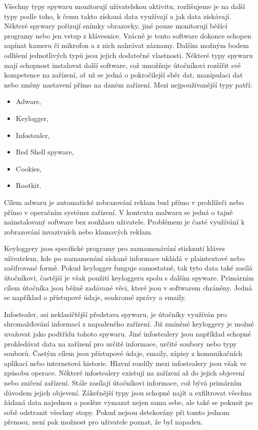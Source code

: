 Všechny typy spywaru monitorují uživatelskou aktivitu, rozlišujeme je na další typy podle toho, k čemu takto získaná data využívají a jak data získávají.
Některé spywary pořizují snímky obrazovky, jiné pouze monitorují běžící programy nebo jen vstup z klávesnice.
Vzácně je tento software dokonce schopen zapínat kameru či mikrofon a z nich nahrávat záznamy.
Dalším možným bodem odlišení jednotlivých typů jsou jejich dodatečné vlastnosti.
Některé typy spywaru mají schopnost instalovat další software, což umožňuje útočníkovi rozšířit své kompetence na zařízení, ať už se jedná o pokročilejší sběr dat, manipulaci dat nebo změny nastavení přímo na daném zařízení.
Mezi nejpoužívanější typy patří:
\begin{itemize}
	\item Adware,
	\item Keylogger,
	\item Infostealer,
	\item Red Shell spyware,
	\item Cookies,
	\item Rootkit.
\end{itemize}\cite{avast_spyware, fortinet_spyware}%

Cílem adwaru je automatické zobrazování reklam bud přímo v prohlížeči nebo přímo v operačním systému zařízení.
V kontextu malwaru se jedná o tajně nainstalovaný software bez souhlasu uživatele.
Problémem je časté využívání k zobrazování invazivních nebo klamavých reklam.\cite{avast_spyware}

Keyloggery jsou specifické programy pro zaznamenávání stisknutí kláves uživatelem, kde po zaznamenání získané informace ukládá v plaintextové nebo zašifrované formě.
Pokud keylogger funguje samostatně, tak tyto data také zasílá útočníkovi, častější je však použití keyloggeru spolu s dalším spyware.
Primárním cílem útočníka jsou běžně zadávané věci, které jsou v softwarem chráněny.
Jedná se například o přístupové údaje, soukromé zprávy a emaily.\cite{avast_spyware}

Infostealer, asi neklasičtější představa spywaru, je útočníky využíván pro shromažďování informací z napadeného zařízení.
Již zmíněné keyloggery je možné uvažovat jako podtřídu tohoto spywaru.
Jiné infostealery jsou například schopné prohledávat data na zařízení pro určité informace, určité soubory nebo typy souborů.
Častým cílem jsou přístupové údaje, emaily, zápisy z komunikačních aplikací nebo internetová historie.
Hlavní rozdíly mezi infostealery jsou však ve způsobu operace.
Některé infostealery existují na zařízení až do jejich objevení nebo zničení zařízení.
Stále zasílají útočníkovi informace, což bývá primárním důvodem jejich objevení.
Zákeřnější typy jsou schopné najít a exfiltrovat všechna žádaná data najednou a posléze vymazat nejen sama sebe, ale také se pokusit po sobě odstranit všechny stopy.
Pokud nejsou detekovány při tomto jednom přenosu, není pak možnost pro uživatele poznat, že byl napaden.\cite{avast_spyware}

